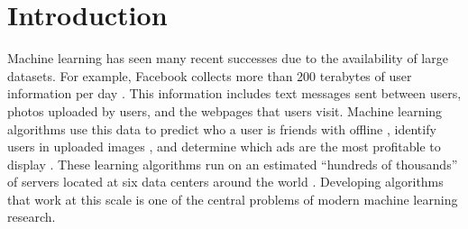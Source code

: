 \documentclass[thesis.tex]{subfiles}
\begin{document}
\chapter{Introduction}
\label{chapter:intro}

\noindent
Machine learning has seen many recent successes due to the availability of large datasets.
For example, Facebook collects more than 200 terabytes of user information per day \citep{facebook2014}.
This information includes text messages sent between users,
photos uploaded by users,
and the webpages that users visit.
Machine learning algorithms use this data to
predict who a user is friends with offline \citep{curtiss2013unicorn},
identify users in uploaded images \citep{taigman2014deepface},
and determine which ads are the most profitable to display \citep{he2014practical}.
These learning algorithms run on an estimated ``hundreds of thousands'' of servers located at six data centers around the world \citep{facebookFAQ}.
Developing algorithms that work at this scale is one of the central problems of modern machine learning research.


\end{document}
